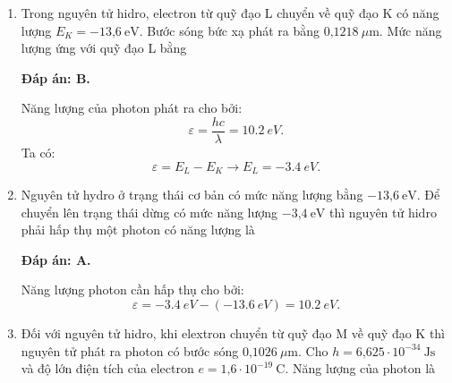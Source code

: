 \begin{enumerate}[label=\bfseries Câu \arabic*:]
{	}
	
\item {} 
	
	\cauhoi
	{Trong nguyên tử hidro, electron từ quỹ đạo L chuyển về quỹ đạo K có năng lượng $E_K= -\text{13,6}\ \text{eV}$. Bước sóng bức xạ phát ra bằng $\text{0,1218}\ \mu\text{m}$. Mức năng lượng ứng với quỹ đạo L bằng 
	}
	
	\loigiai
	{		\textbf{Đáp án: B.}
		
Năng lượng của photon phát ra cho bởi:
$$
	\varepsilon = \dfrac{hc}{\lambda} = \SI{10,2}{eV}.
$$
Ta có:
$$
	\varepsilon = E_{L} - E_{K} \rightarrow E_{L} = \SI{-3,4}{eV}.
$$
	}
	
	\item {} 
	
	\cauhoi
	{Nguyên tử hydro ở trạng thái cơ bản có mức năng lượng bằng $-\text{13,6}\ \text{eV}.$ Để chuyển lên trạng thái dừng có mức năng lượng $-\text{3,4}\ \text{eV}$ thì nguyên tử hidro phải hấp thụ một photon có năng lượng là 
	}
	
	\loigiai
	{		\textbf{Đáp án: A.}
		
Năng lượng photon cần hấp thụ cho bởi:
$$
	\varepsilon = \SI{-3,4}{eV} - ( \SI{-13,6}{eV} ) = \SI{10,2}{eV}.
$$
		
	}
	
	\item {} 
	
	\cauhoi
	{Đối với nguyên tử hidro, khi elextron chuyển từ quỹ đạo M về quỹ đạo K thì nguyên tử phát ra photon có bước sóng $\text{0,1026}\ \mu\text{m}$. Cho $h=\text{6,625}\cdot 10^{-34}\ \text{Js}$ và độ lớn điện tích của electron $e=\text{1,6}\cdot 10^{-19}\ \text{C}$. Năng lượng của photon là
	}
	

\end{enumerate}

